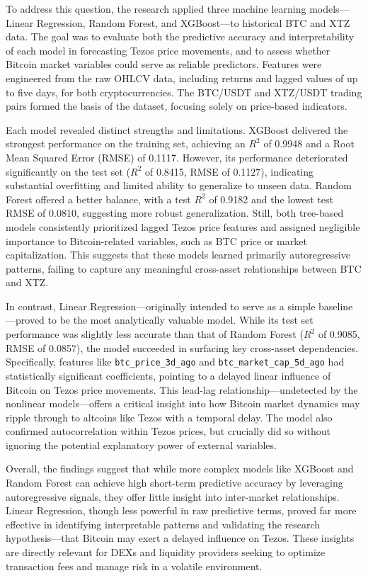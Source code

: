 To address this question, the research applied three machine learning models—Linear Regression, Random Forest, and XGBoost—to historical BTC and XTZ data. 
The goal was to evaluate both the predictive accuracy and interpretability of each model in forecasting Tezos price movements, and to assess whether Bitcoin market variables could serve as reliable predictors. 
Features were engineered from the raw OHLCV data, including returns and lagged values of up to five days, for both cryptocurrencies. 
The BTC/USDT and XTZ/USDT trading pairs formed the basis of the dataset, focusing solely on price-based indicators.

Each model revealed distinct strengths and limitations. XGBoost delivered the strongest performance on the training set, achieving an $R^2$ of 0.9948 and a Root Mean Squared Error (RMSE) of 0.1117. 
However, its performance deteriorated significantly on the test set ($R^2$ of 0.8415, RMSE of 0.1127), indicating substantial overfitting and limited ability to generalize to unseen data. 
Random Forest offered a better balance, with a test $R^2$ of 0.9182 and the lowest test RMSE of 0.0810, suggesting more robust generalization. 
Still, both tree-based models consistently prioritized lagged Tezos price features and assigned negligible importance to Bitcoin-related variables, such as BTC price or market capitalization. 
This suggests that these models learned primarily autoregressive patterns, failing to capture any meaningful cross-asset relationships between BTC and XTZ.

In contrast, Linear Regression—originally intended to serve as a simple baseline—proved to be the most analytically valuable model. 
While its test set performance was slightly less accurate than that of Random Forest ($R^2$ of 0.9085, RMSE of 0.0857), the model succeeded in surfacing key cross-asset dependencies. 
Specifically, features like \texttt{btc\_price\_3d\_ago} and \texttt{btc\_market\_cap\_5d\_ago} had statistically significant coefficients, pointing to a delayed linear influence of Bitcoin on Tezos price movements. 
This lead-lag relationship—undetected by the nonlinear models—offers a critical insight into how Bitcoin market dynamics may ripple through to altcoins like Tezos with a temporal delay. 
The model also confirmed autocorrelation within Tezos prices, but crucially did so without ignoring the potential explanatory power of external variables.

Overall, the findings suggest that while more complex models like XGBoost and Random Forest can achieve high short-term predictive accuracy by leveraging autoregressive signals, they offer little insight into inter-market relationships. 
Linear Regression, though less powerful in raw predictive terms, proved far more effective in identifying interpretable patterns and validating the research hypothesis—that Bitcoin may exert a delayed influence on Tezos. 
These insights are directly relevant for DEXs and liquidity providers seeking to optimize transaction fees and manage risk in a volatile environment. 
